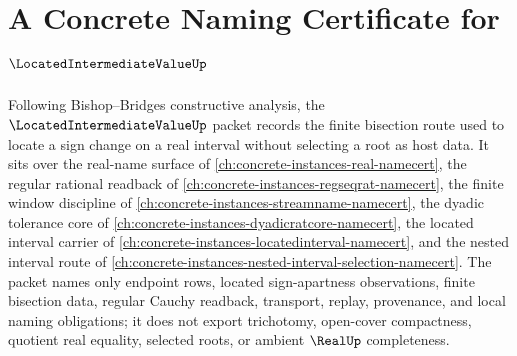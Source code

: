 \chapter{A Concrete Naming Certificate for $\LocatedIntermediateValueUp$}
\label{ch:concrete-instances-located-intermediate-value-namecert}

Following Bishop--Bridges constructive analysis, the $\LocatedIntermediateValueUp$ packet records the finite bisection route used to locate a sign change on a real interval without selecting a root as host data. It sits over the real-name surface of \autoref{ch:concrete-instances-real-namecert}, the regular rational readback of \autoref{ch:concrete-instances-regseqrat-namecert}, the finite window discipline of \autoref{ch:concrete-instances-streamname-namecert}, the dyadic tolerance core of \autoref{ch:concrete-instances-dyadicratcore-namecert}, the located interval carrier of \autoref{ch:concrete-instances-locatedinterval-namecert}, and the nested interval route of \autoref{ch:concrete-instances-nested-interval-selection-namecert}. The packet names only endpoint rows, located sign-apartness observations, finite bisection data, regular Cauchy readback, transport, replay, provenance, and local naming obligations; it does not export trichotomy, open-cover compactness, quotient real equality, selected roots, or ambient $\RealUp$ completeness.

